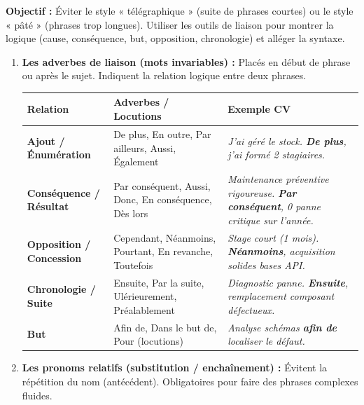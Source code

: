 \documentclass[11pt]{article}
\newcommand{\cle}[1]{{\popxbold\color{popdark}#1}}
\begin{document}
\begin{methode}
    \textbf{Objectif :} Éviter le style « télégraphique » (suite de phrases courtes) ou le style « pâté » (phrases trop longues). Utiliser les outils de liaison pour montrer la logique (cause, conséquence, but, opposition, chronologie) et alléger la syntaxe.
    \begin{enumerate}
        \item \textbf{Les adverbes de liaison (mots invariables) :} Placés en début de phrase ou après le sujet. Indiquent la relation logique entre deux phrases.
              \begin{center}
              \begin{tabularx}{\linewidth}{|l|X|l|}\hline
              \rowcolor{popblueL} \textbf{Relation} & \textbf{Adverbes / Locutions} & \textbf{Exemple CV} \\ \hline
              \textbf{Ajout / Énumération} & \cle{De plus}, \cle{En outre}, \cle{Par ailleurs}, \cle{Aussi}, \cle{Également} & \textit{J'ai géré le stock. \textbf{De plus}, j'ai formé 2 stagiaires.} \\ \hline
              \textbf{Conséquence / Résultat} & \cle{Par conséquent}, \cle{Aussi}, \cle{Donc}, \cle{En conséquence}, \cle{Dès lors} & \textit{Maintenance préventive rigoureuse. \textbf{Par conséquent}, 0 panne critique sur l'année.} \\ \hline
              \textbf{Opposition / Concession} & \cle{Cependant}, \cle{Néanmoins}, \cle{Pourtant}, \cle{En revanche}, \cle{Toutefois} & \textit{Stage court (1 mois). \textbf{Néanmoins}, acquisition solides bases API.} \\ \hline
              \textbf{Chronologie / Suite} & \cle{Ensuite}, \cle{Par la suite}, \cle{Ulérieurement}, \cle{Préalablement} & \textit{Diagnostic panne. \textbf{Ensuite}, remplacement composant défectueux.} \\ \hline
              \textbf{But} & \cle{Afin de}, \cle{Dans le but de}, \cle{Pour} (locutions) & \textit{Analyse schémas \textbf{afin de} localiser le défaut.} \\ \hline
              \end{tabularx}
              \end{center}
        \item \textbf{Les pronoms relatifs (substitution / enchaînement) :} Évitent la répétition du nom (antécédent). Obligatoires pour faire des phrases complexes fluides.
              \begin{itemize}

\end{itemize}
\end{enumerate}
\end{methode}
\end{document}
